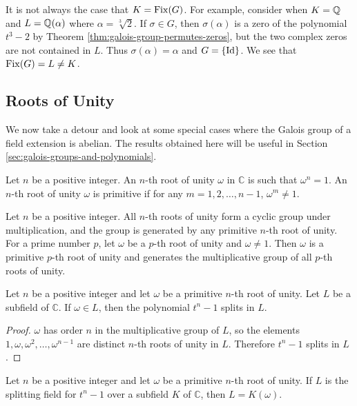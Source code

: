 \begin{example}
    It is not always the case that $K = \operatorname{Fix}(G)$. For example, consider when $K = \mathbb Q$ and $L = \mathbb Q (\alpha)$ where $\alpha = \sqrt[3]{2}$. If $\sigma \in G$, then $\sigma(\alpha)$ is a zero of the polynomial $t^3 - 2$ by Theorem \ref{thm:galois-group-permutes-zeros}, but the two complex zeros are not contained in $L$. Thus $\sigma(\alpha) = \alpha$ and $G = \{ \operatorname{Id} \}$. We see that $\operatorname{Fix}(G) = L \neq K$. 
\end{example}

\subsection{Roots of Unity}
We now take a detour and look at some special cases where the Galois group of a field extension is abelian. The results obtained here will be useful in Section \ref{sec:galois-groups-and-polynomials}. 

\begin{definition}
	Let $n$ be a positive integer. An $n$-th root of unity $\omega$ in $\mathbb C$ is such that $\omega ^ n = 1$. An $n$-th root of unity $\omega$ is primitive if for any $m = 1, 2, \dots, n - 1$, $\omega ^ m \neq 1$.
\end{definition}

\begin{observation}
	Let $n$ be a positive integer. All $n$-th roots of unity form a cyclic group under multiplication, and the group is generated by any primitive $n$-th root of unity. For a prime number $p$, let $\omega$ be a $p$-th root of unity and $\omega \neq 1$. Then $\omega$ is a primitive $p$-th root of unity and generates the multiplicative group of all $p$-th roots of unity.
\end{observation}

\begin{theorem} \label{thm:unity-1}
	Let $n$ be a positive integer and let $\omega$ be a primitive $n$-th root of unity. Let $L$ be a subfield of $\mathbb C$. If $\omega \in L$, then the polynomial $t^n - 1$ splits in $L$.
\end{theorem}
\begin{proof}
	$\omega$ has order $n$ in the multiplicative group of $L$, so the elements $1, \omega, \omega^2, \ldots, \omega^{n-1}$ are distinct $n$-th roots of unity in $L$. Therefore $t^n-1$ splits in $L$.
\end{proof}

\begin{theorem} \label{thm:unity-2}
	Let $n$ be a positive integer and let $\omega$ be a primitive $n$-th root of unity. If $L$ is the splitting field for $t^n - 1$ over a subfield $K$ of $\mathbb C$, then $L = K(\omega)$.
\end{theorem}

